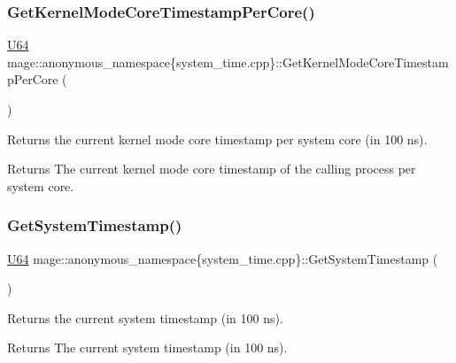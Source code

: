 \subsubsection{\texorpdfstring{Get\+Kernel\+Mode\+Core\+Timestamp\+Per\+Core()}{GetKernelModeCoreTimestampPerCore()}}
{\footnotesize\ttfamily \mbox{\hyperlink{namespacemage_ae0ad2dd0035dba92ed0f2e84c182b03b}{U64}} mage\+::anonymous\+\_\+namespace\{system\+\_\+time.\+cpp\}\+::Get\+Kernel\+Mode\+Core\+Timestamp\+Per\+Core (\begin{DoxyParamCaption}{ }\end{DoxyParamCaption})\hspace{0.3cm}{\ttfamily [noexcept]}}

Returns the current kernel mode core timestamp per system core (in 100 ns).

\begin{DoxyReturn}{Returns}
The current kernel mode core timestamp of the calling process per system core. 
\end{DoxyReturn}
\mbox{\label{namespacemage_1_1anonymous__namespace_02system__time_8cpp_03_ac278dc49fcd5785f9cb8863fdf9fdbdd}} 
\subsubsection{\texorpdfstring{Get\+System\+Timestamp()}{GetSystemTimestamp()}}
{\footnotesize\ttfamily \mbox{\hyperlink{namespacemage_ae0ad2dd0035dba92ed0f2e84c182b03b}{U64}} mage\+::anonymous\+\_\+namespace\{system\+\_\+time.\+cpp\}\+::Get\+System\+Timestamp (\begin{DoxyParamCaption}{ }\end{DoxyParamCaption})\hspace{0.3cm}{\ttfamily [noexcept]}}

Returns the current system timestamp (in 100 ns).

\begin{DoxyReturn}{Returns}
The current system timestamp (in 100 ns). 
\end{DoxyReturn}
\mbox{\label{namespacemage_1_1anonymous__namespace_02system__time_8cpp_03_ad01a027f9d7c32f17bdd5335e403a155}} 
